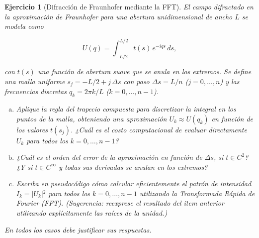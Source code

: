 \documentclass[12pt]{article}%
\newtheorem{exercise}{Ejercicio}
\begin{document}
\begin{exercise}[Difracción de Fraunhofer mediante la FFT]
El campo difractado en la aproximación de Fraunhofer para una abertura unidimensional de ancho $L$ se modela como

$$U(q) = \int_{-L/2}^{L/2} t(s)\,e^{-i q s}\,ds,$$

con $t(s)$ una función de abertura suave que se anula en los extremos. Se define una malla uniforme $s_j = -L/2 + j\,\Delta s$ con paso $\Delta s = L/n$ ($j=0, \ldots, n$) y las frecuencias discretas $q_k = 2\pi k/L$ ($k=0, \ldots, n-1$).

\begin{enumerate}[(a)]
\item Aplique la regla del trapecio compuesta para discretizar la integral en los puntos de la malla, obteniendo una aproximación $U_k \approx U(q_k)$ en función de los valores $t(s_j)$. ¿Cuál es el costo computacional de evaluar directamente $U_k$ para todos los $k = 0, \ldots, n-1$? 
\item ¿Cuál es el orden del error de la aproximación en función de $\Delta s$, si $t\in C^2$? ¿Y si $t\in C^\infty$ y todas sus derivadas se anulan en los extremos?
\item Escriba en pseudocódigo cómo calcular eficientemente el patrón de intensidad $I_k = \vert{}U_k\vert{}^2$ para todos los $k = 0, \ldots, n-1$ utilizando la Transformada Rápida de Fourier (FFT). (Sugerencia: reexprese el resultado del item anterior utilizando explícitamente las raíces de la unidad.)
\end{enumerate}
\end{exercise}


\vskip 2.5cm
\begin{center}
    \textit{En todos los casos debe justificar sus respuestas.}
\end{center}
\end{document}
